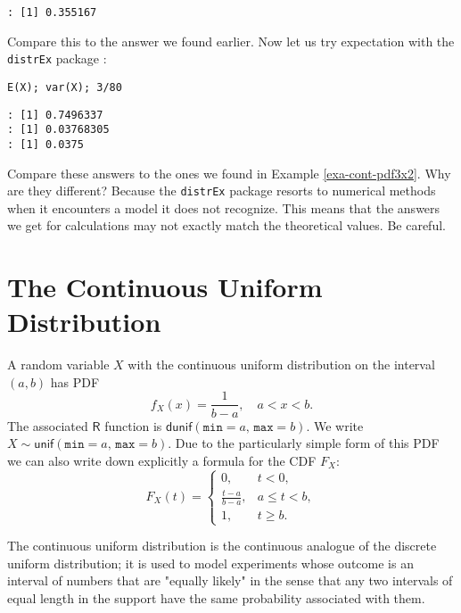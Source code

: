 \begin{verbatim}
: [1] 0.355167
\end{verbatim}

Compare this to the answer we found earlier. Now let us try
expectation with the \texttt{distrEx} package \cite{distrEx}:
\begin{verbatim}
E(X); var(X); 3/80
\end{verbatim}

\begin{verbatim}
: [1] 0.7496337
: [1] 0.03768305
: [1] 0.0375
\end{verbatim}

Compare these answers to the ones we found in Example \ref{exa-cont-pdf3x2}. Why
are they different? Because the \texttt{distrEx} package resorts to numerical
methods when it encounters a model it does not recognize. This means
that the answers we get for calculations may not exactly match the
theoretical values. Be careful.

\section{The Continuous Uniform Distribution}
\label{sec-6-2}

A random variable \(X\) with the continuous uniform distribution on
the interval \((a,b)\) has PDF
\begin{equation}
f_{X}(x)=\frac{1}{b-a}, \quad a < x < b.
\end{equation}
The associated \(\mathsf{R}\) function is
\(\mathsf{dunif}(\mathtt{min}=a,\,\mathtt{max}=b)\). We write
\(X\sim\mathsf{unif}(\mathtt{min}=a,\,\mathtt{max}=b)\). Due to the
particularly simple form of this PDF we can also write down explicitly
a formula for the CDF \(F_{X}\): \begin{equation} \label{eq-unif-cdf} F_{X}(t) = \begin{cases} 0, & t < 0,\\ \frac{t-a}{b-a}, & a\leq t < b,\\ 1, & t \geq b. \end{cases} \end{equation}

The continuous uniform distribution is the continuous analogue of the
discrete uniform distribution; it is used to model experiments whose
outcome is an interval of numbers that are "equally likely" in the
sense that any two intervals of equal length in the support have the
same probability associated with them.


